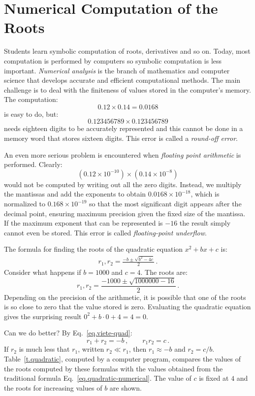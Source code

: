 \section{Numerical Computation of the Roots}\label{s.numerical}

Students learn symbolic computation of roots, derivatives and so on. Today, most computation is performed by computers so symbolic computation is less important. \emph{Numerical analysis} is the branch of mathematics and computer science that develops accurate and efficient computational methods. The main challenge is to deal with the finiteness of values stored in the computer's memory. The computation:
\[0.12\times 0.14=0.0168\]
is easy to do, but:
\[
0.123456789\times 0.123456789\]
needs eighteen digits to be accurately represented and this cannot be done in a memory word that stores sixteen digits. This error is called a \emph{round-off error}.

An even more serious problem is encountered when \emph{floating point arithmetic} is performed. Clearly:
\[(0.12\times 10^{-10})\times (0.14\times 10^{-8})\]
would not be computed by writing out all the zero digits. Instead, we multiply the mantissas and add the exponents to obtain $0.0168\times 10^{-18}$, which is normalized to $0.168\times 10^{-19}$ so that the most significant digit appears after the decimal point, ensuring maximum precision given the fixed size of the mantissa. If the maximum exponent that can be represented is $-16$ the result simply cannot even be stored. This error is called \emph{floating-point underflow}.

\newpage

The formula for finding the roots of the quadratic equation $x^2+bx+c$ is:
\begin{align}
r_1, r_2 = \frac{-b\pm\sqrt{b^2-4c}}{2}\,.\label{eq.quadratic-numerical}
\end{align}
Consider what happens if $b=1000$ and $c=4$. The roots are:
\[
r_1, r_2 = \frac{-1000\pm\sqrt{1000000-16}}{2}\,.
\]
Depending on the precision of the arithmetic, it is possible that one of the roots is so close to zero that the value stored is zero. Evaluating the quadratic equation gives the surprising result $0^2+b\cdot 0 +4= 4= 0$.

Can we do better? By Eq.~\ref{eq.viete-quad}:
\[
r_1+r_2 = -b\,,\quad\quad r_1r_2=c\,.
\]
If $r_2$ is much less that $r_1$, written $r_2\ll r_1$, then $r_1\approx -b$ and $r_2=c/b$. Table~\ref{t.quadratic}, computed by a computer program, compares the values of the roots computed by these formulas with the values obtained from the traditional formula Eq.~\ref{eq.quadratic-numerical}. The value of $c$ is fixed at $4$ and the roots for increasing values of $b$ are shown.

